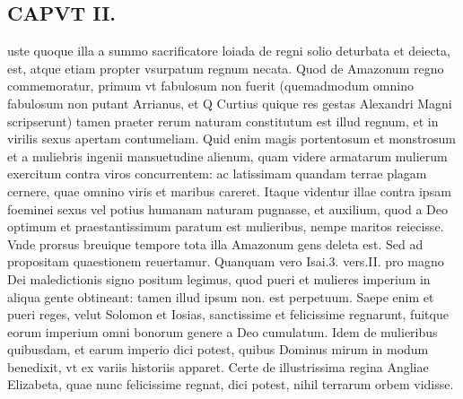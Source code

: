 \documentclass{article}
\begin{document}
\begin{pages}
\section*{CAPVT  II. }
\marginpar{[ p.85. ]}\pstart uste quoque illa a summo sacrificatore loiada de regni solio deturbata et deiecta, est, atque etiam propter vsurpatum regnum necata. Quod de Amazonum regno commemoratur, primum vt fabulosum non fuerit (quemadmodum omnino fabulosum non putant Arrianus, et Q Curtius quique res gestas Alexandri Magni scripserunt) tamen praeter rerum naturam constitutum est illud regnum, et in virilis sexus apertam contumeliam. Quid enim magis portentosum et monstrosum et a muliebris ingenii mansuetudine alienum, quam videre armatarum mulierum exercitum contra viros concurrentem: ac latissimam quandam terrae plagam cernere, quae omnino viris et maribus careret. Itaque videntur illae contra ipsam foeminei sexus vel potius humanam naturam pugnasse, et auxilium, quod a Deo optimum et praestantissimum paratum est mulieribus, nempe maritos reiecisse. Vnde prorsus breuique tempore tota illa Amazonum gens deleta est. Sed ad propositam quaestionem reuertamur. Quanquam vero Isai.3. vers.II. pro magno Dei maledictionis signo positum legimus, quod pueri et mulieres imperium in aliqua gente obtineant: tamen illud ipsum non. est perpetuum. Saepe enim et pueri reges, velut Solomon et Iosias, sanctissime et felicissime regnarunt, fuitque eorum imperium omni bonorum genere a Deo cumulatum. Idem de mulieribus quibusdam, et earum imperio dici potest, quibus Dominus mirum in modum benedixit, vt ex variis historiis apparet. Certe de illustrissima regina Angliae Elizabeta, quae nunc felicissime regnat, dici potest, nihil terrarum orbem vidisse.  \pend

\end{pages}
\end{document}
